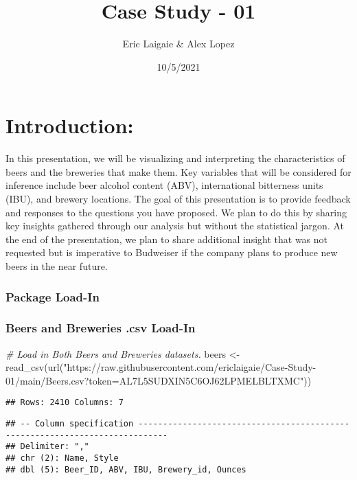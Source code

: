 \documentclass[
]{article}
\title{Case Study - 01}
\author{Eric Laigaie \& Alex Lopez}
\date{10/5/2021}
\newenvironment{Shaded}{\begin{snugshade}}{\end{snugshade}}
\newcommand{\CommentTok}[1]{\textcolor[rgb]{0.56,0.35,0.01}{\textit{#1}}}
\newcommand{\FunctionTok}[1]{\textcolor[rgb]{0.00,0.00,0.00}{#1}}
\newcommand{\NormalTok}[1]{#1}
\newcommand{\OtherTok}[1]{\textcolor[rgb]{0.56,0.35,0.01}{#1}}
\newcommand{\StringTok}[1]{\textcolor[rgb]{0.31,0.60,0.02}{#1}}
\begin{document}
\maketitle

\hypertarget{introduction}{%
\section{Introduction:}\label{introduction}}

In this presentation, we will be visualizing and interpreting the
characteristics of beers and the breweries that make them. Key variables
that will be considered for inference include beer alcohol content
(ABV), international bitterness units (IBU), and brewery locations. The
goal of this presentation is to provide feedback and responses to the
questions you have proposed. We plan to do this by sharing key insights
gathered through our analysis but without the statistical jargon. At the
end of the presentation, we plan to share additional insight that was
not requested but is imperative to Budweiser if the company plans to
produce new beers in the near future.

\hypertarget{package-load-in}{%
\subsubsection{Package Load-In}\label{package-load-in}}

\hypertarget{beers-and-breweries-.csv-load-in}{%
\subsubsection{Beers and Breweries .csv
Load-In}\label{beers-and-breweries-.csv-load-in}}

\begin{Shaded}
\begin{Highlighting}[]
\CommentTok{\# Load in Both Beers and Breweries datasets.}
\NormalTok{beers }\OtherTok{\textless{}{-}} \FunctionTok{read\_csv}\NormalTok{(}\FunctionTok{url}\NormalTok{(}\StringTok{"https://raw.githubusercontent.com/ericlaigaie/Case{-}Study{-}01/main/Beers.csv?token=AL7L5SUDXIN5C6OJ62LPMELBLTXMC"}\NormalTok{))}
\end{Highlighting}
\end{Shaded}

\begin{verbatim}
## Rows: 2410 Columns: 7
\end{verbatim}

\begin{verbatim}
## -- Column specification ----------------------------------------------------------------------------
## Delimiter: ","
## chr (2): Name, Style
## dbl (5): Beer_ID, ABV, IBU, Brewery_id, Ounces
\end{verbatim}
\end{document}
